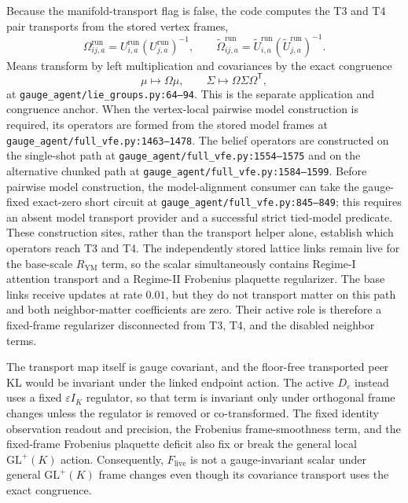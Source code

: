 Because the manifold-transport flag is false, the code computes the T3 and T4 pair transports from the stored vertex frames,
\begin{equation}
 \Omega_{ij,a}^{\mathrm{run}}
 =U_{i,a}^{\mathrm{run}}(U_{j,a}^{\mathrm{run}})^{-1},
 \qquad
 \widetilde\Omega_{ij,a}^{\mathrm{run}}
 =\widetilde U_{i,a}^{\mathrm{run}}
 (\widetilde U_{j,a}^{\mathrm{run}})^{-1}.
\end{equation}
Means transform by left multiplication and covariances by the exact congruence
\begin{equation}
 \mu\mapsto\Omega\mu,
 \qquad
 \Sigma\mapsto\Omega\Sigma\Omega^{\mathsf T},
\end{equation}
at \texttt{gauge\_agent/lie\_groups.py:64--94}. This is the separate application and congruence anchor. When the vertex-local pairwise model construction is required, its operators are formed from the stored model frames at \texttt{gauge\_agent/full\_vfe.py:1463--1478}. The belief operators are constructed on the single-shot path at \texttt{gauge\_agent/full\_vfe.py:1554--1575} and on the alternative chunked path at \texttt{gauge\_agent/full\_vfe.py:1584--1599}. Before pairwise model construction, the model-alignment consumer can take the gauge-fixed exact-zero short circuit at \texttt{gauge\_agent/full\_vfe.py:845--849}; this requires an absent model transport provider and a successful strict tied-model predicate. These construction sites, rather than the transport helper alone, establish which operators reach T3 and T4. The independently stored lattice links remain live for the base-scale $R_{\mathrm{YM}}$ term, so the scalar simultaneously contains Regime-I attention transport and a Regime-II Frobenius plaquette regularizer. The base links receive updates at rate $0.01$, but they do not transport matter on this path and both neighbor-matter coefficients are zero. Their active role is therefore a fixed-frame regularizer disconnected from T3, T4, and the disabled neighbor terms.

The transport map itself is gauge covariant, and the floor-free transported peer KL would be invariant under the linked endpoint action. The active $D_\varepsilon$ instead uses a fixed $\varepsilon I_K$ regulator, so that term is invariant only under orthogonal frame changes unless the regulator is removed or co-transformed. The fixed identity observation readout and precision, the Frobenius frame-smoothness term, and the fixed-frame Frobenius plaquette deficit also fix or break the general local $\mathrm{GL}^{+}(K)$ action. Consequently, $F_{\mathrm{live}}$ is not a gauge-invariant scalar under general $\mathrm{GL}^{+}(K)$ frame changes even though its covariance transport uses the exact congruence.

